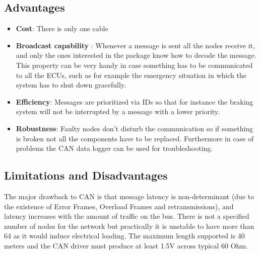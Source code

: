 \documentclass{article}
\begin{document}
    



\subsection{Advantages}
\begin{itemize}
\item \textbf{Cost}: There is only one cable
\item \textbf{Broadcast capability} : Whenever a message is sent all the nodes receive it, and only the ones interested in the package know how to decode the message. This property can be very handy in case something has to be communicated to all the ECUs, such as for example the emergency situation in which the system has to shut down gracefully. 
\item \textbf{Efficiency}: Messages are prioritized via IDs so that for instance the braking system will not be interrupted by a message with a lower priority. 
\item \textbf{Robustness}: Faulty nodes don't disturb the communication so if something is broken not all the components have to be replaced. Furthermore in case of problems the CAN data logger can be used for troubleshooting.
\end{itemize}

\subsection{Limitations and Disadvantages}
The major drawback to CAN is that message latency is non-determinant (due to the existence
of Error Frames, Overload Frames and retransmissions), and latency increases with the amount of traffic on
the bus.
\newline
\newline
There is not a specified number of nodes for the network but practically it is unstable to have more than 64 as it would induce electrical loading. The maximum length supported is 40 meters and the CAN driver must produce at least 1.5V across typical 60 Ohm.
\end{document}
